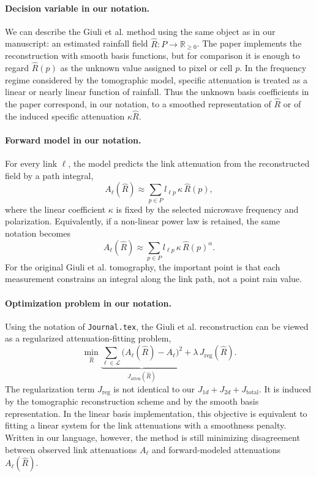 \documentclass[11pt]{article}
\newcommand{\Rhat}{\hat{R}}
\newcommand{\Jatten}{J_{\mathrm{atten}}}
\newcommand{\Jreg}{J_{\mathrm{reg}}}
\begin{document}
\paragraph{Decision variable in our notation.}
We can describe the Giuli et al. method using the same object as in our manuscript: an estimated rainfall field $\Rhat:P\to\mathbb{R}_{\geq 0}$.
The paper implements the reconstruction with smooth basis functions, but for comparison it is enough to regard $\Rhat(p)$ as the unknown value assigned to pixel or cell $p$.
In the frequency regime considered by the tomographic model, specific attenuation is treated as a linear or nearly linear function of rainfall.
Thus the unknown basis coefficients in the paper correspond, in our notation, to a smoothed representation of $\Rhat$ or of the induced specific attenuation $\kappa\Rhat$.

\paragraph{Forward model in our notation.}
For every link $\ell$, the model predicts the link attenuation from the reconstructed field by a path integral,
\[
  A_\ell(\Rhat)
  \approx
  \sum_{p\in P} l_{\ell p}\,\kappa\,\Rhat(p),
\]
where the linear coefficient $\kappa$ is fixed by the selected microwave frequency and polarization.
Equivalently, if a non-linear power law is retained, the same notation becomes
\[
  A_\ell(\Rhat)
  \approx
  \sum_{p\in P} l_{\ell p}\,\kappa\,\Rhat(p)^\alpha .
\]
For the original Giuli et al. tomography, the important point is that each measurement constrains an integral along the link path, not a point rain value.

\paragraph{Optimization problem in our notation.}
Using the notation of \texttt{Journal.tex}, the Giuli et al. reconstruction can be viewed as a regularized attenuation-fitting problem,
\[
  \min_{\Rhat}
  \underbrace{\sum_{\ell\in\mathcal{L}}
  \bigl(A_\ell(\Rhat)-A_\ell\bigr)^2}_{\Jatten(\Rhat)}
  +
  \lambda\,\Jreg(\Rhat).
\]
The regularization term $\Jreg$ is not identical to our $J_{1d}+J_{2d}+J_{\mathrm{total}}$.
It is induced by the tomographic reconstruction scheme and by the smooth basis representation.
In the linear basis implementation, this objective is equivalent to fitting a linear system for the link attenuations with a smoothness penalty.
Written in our language, however, the method is still minimizing disagreement between observed link attenuations $A_\ell$ and forward-modeled attenuations $A_\ell(\Rhat)$.
\end{document}
